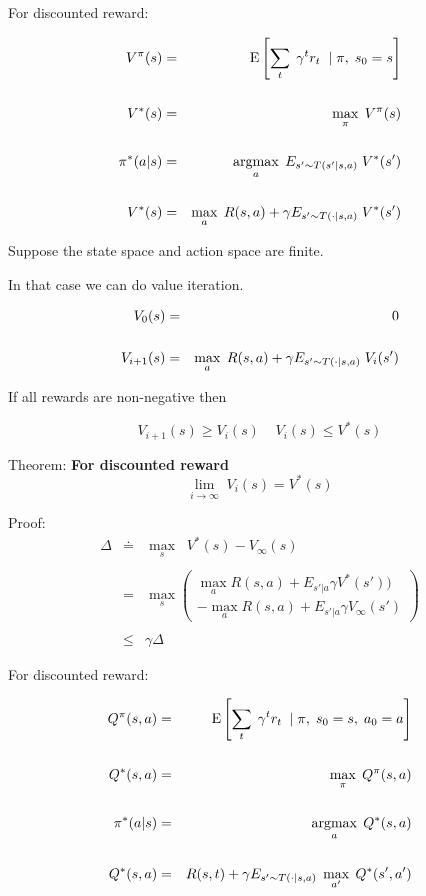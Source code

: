 {For discounted reward:

\begin{eqnarray*}
  V^\pi(s) & = & \mathrm{E}\left[\sum_t \;\gamma^t r_t  \;\;|\; \pi, \; s_0 = s\right] \\
  \\
  V^*(s) & = & \max_\pi \;V^\pi(s) \\
  \\
  \pi^*(a|s) & = & \operatorname*{argmax}_a\;E_{s' \sim T(s'|s,a)}\;V^*(s') \\
  \\
  V^*(s) & = & \max_a\; R(s,a) + \gamma E_{s' \sim T(\cdot|s,a)}\;V^*(s')
\end{eqnarray*}


Suppose the state space and action space are finite.

\vfill
In that case we can do value iteration.

\begin{eqnarray*}
  V_0(s) & = & 0 \\
  \\
  V_{i+1}(s) & = & \max_a\; R(s,a) + \gamma E_{s' \sim T(\cdot|s,a)}\;V_i(s')
\end{eqnarray*}

\vfill
If all rewards are non-negative then

$$V_{i+1}(s) \geq V_i(s)\;\;\;\;V_i(s) \leq V^*(s)$$


Theorem: {\bf For discounted reward}
\vfill
$$\lim_{i \rightarrow \infty}\;V_i(s) = V^*(s)$$

\vfill
Proof:
\begin{eqnarray*}
  \Delta & \doteq & \max_s\;\;V^*(s) - V_\infty(s) \\
  \\
  & = & \max_s \left(\begin{array}{l} \max_a R(s,a) + E_{s'|a} \gamma V^*(s')) \\ - \max_a R(s,a) + E_{s'|a} \gamma V_\infty(s')\end{array}\right) \\
  \\
  & \leq & \gamma \Delta
\end{eqnarray*}



For discounted reward:

\begin{eqnarray*}
  Q^\pi(s,a) & = & \mathrm{E}\left[\sum_t \;\gamma^tr_t \;\;|\; \pi, \; s_0 = s,\;a_0 = a\right] \\
  \\
  Q^*(s,a) & = & \max_\pi \;Q^\pi(s,a) \\
  \\
  \pi^*(a|s) & = & \operatorname*{argmax}_a\;Q^*(s,a) \\
  \\
  Q^*(s,a) & = & R(s,t) + \gamma E_{s' \sim T(\cdot|s,a)}\;\max_{a'}\; Q^*(s',a')
\end{eqnarray*}

}
